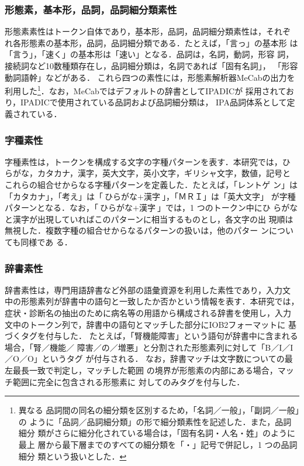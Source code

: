 \documentclass[japanese]{jnlp_1.4}
\begin{document}
\subsubsection*{形態素，基本形，品詞，品詞細分類素性}

形態素素性はトークン自体であり，基本形，品詞，品詞細分類素性は，それぞ
れ各形態素の基本形，品詞，品詞細分類である．たとえば，「言っ」の基本形
は「言う」，「速く」の基本形は「速い」となる．品詞は，名詞，動詞，形容
詞，接続詞など10数種類存在し，品詞細分類は，名詞であれば「固有名詞」，
「形容動詞語幹」などがある．
これら四つの素性には，形態素解析器MeCabの出力を利用した\footnote{異なる
  品詞間の同名の細分類を区別するため，「名詞／一般」，「副詞／一般」の
  ように「品詞／品詞細分類」の形で細分類素性を記述した．また，品詞細分
  類がさらに細分化されている場合は，「固有名詞・人名・姓」のように最上
  層から最下層までのすべての細分類を「・」記号で併記し，1 つの品詞細分
  類という扱いとした．}．なお，MeCabではデフォルトの辞書としてIPADICが
採用されており，IPADICで使用されている品詞および品詞細分類は，
IPA品詞体系として定義されている．


\subsubsection*{字種素性}

字種素性は，トークンを構成する文字の字種パターンを表す．本研究では，ひ
らがな，カタカナ，漢字，英大文字，英小文字，ギリシャ文字，数値，記号と
これらの組合せからなる字種パターンを定義した．たとえば，「レントゲ
ン」は「カタカナ」，「考え」は「$\text{ひらがな}+\text{漢字}$」，「ＭＲＩ」は「英大文字」
が字種パターンとなる．なお，「$\text{ひらがな}+\text{漢字}$」では，1 つのトークン中にひ
らがなと漢字が出現していればこのパターンに相当するものとし，各文字の出
現順は無視した．複数字種の組合せからなるパターンの扱いは，他のパター
ンについても同様であ
\linebreak
る．


\subsubsection*{辞書素性}

辞書素性は，専門用語辞書など外部の語彙資源を利用した素性であり，入力文
中の形態素列が辞書中の語句と一致したか否かという情報を表す．本研究では，
症状・診断名の抽出のために病名等の用語から構成される辞書を使用し，入力
文中のトークン列で，辞書中の語句とマッチした部分にIOB2フォーマットに
基づくタグを付与した．
たとえば，「腎機能障害」という語句が辞書中に含まれる場合，「腎／機能／
障害／の／増悪」と分割された形態素列に対して「B／I／I／O／O」というタグ
が付与される．
なお，辞書マッチは文字数についての最左最長一致で判定し，マッチした範囲
の境界が形態素の内部にある場合，マッチ範囲に完全に包含される形態素に
対してのみタグを付与した．
\end{document}
